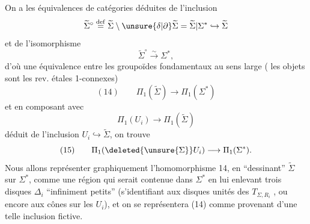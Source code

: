 On a les équivalences de catégories
déduites de l'inclusion
\[
\widetilde\Sigma^\circ \overset{\mathrm{def}}= \widetilde\Sigma\setminus\unsure{\delta|\partial}\widetilde\Sigma = \widetilde\Sigma|\Sigma^* \hookrightarrow \widetilde\Sigma
\]
et de l'isomorphisme
\[
\widetilde\Sigma^\circ \xrightarrow{\sim} \Sigma^*,
\]
d'où une équivalence entre les groupoïdes fondamentaux au sens large ( les objets sont les rev. étales 1-connexes)
\[
(14)\qquad \Pi_1(\widetilde\Sigma) \longrightarrow \Pi_1(\Sigma^*)
\]
et en composant avec
\[
\Pi_1(U_i)\longrightarrow \Pi_1(\widetilde\Sigma)
\]
déduit de l'inclusion $U_i\hookrightarrow\widetilde\Sigma$, on trouve
\[
(15)\qquad \Pi_1(\deleted{\unsure{\Sigma}}U_i)\longrightarrow\Pi_1(\Sigma^*).
\]
Nous allons représenter graphiquement l'homomorphisme 14, en ``dessinant'' $\widetilde\Sigma$ sur $\Sigma^*$, comme une région qui serait contenue dans $\Sigma^*$ en lui enlevant  trois disques  $\Delta_i$ ``infiniment petits''  (s'identifiant aux disques unités des $T_{\Sigma,R_i}$ , ou encore aux cônes sur les $U_i$), et on se représentera (14) comme provenant d'une telle inclusion fictive.
